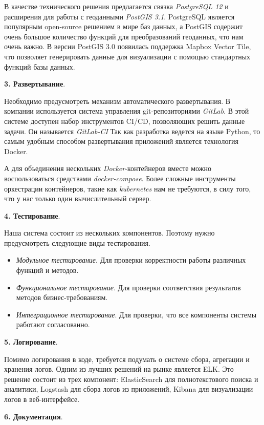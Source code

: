 В качестве технического решения предлагается связка \textit{PostgreSQL 12} и расширения для работы с геоданными
\textit{PostGIS 3.1}. PostgreSQL является популярным open-source решением в мире баз данных,
а PostGIS содержит очень большое количество функций для преобразований геоданных, что нам очень важно.
В версии PostGIS 3.0 появилась поддержка Mapbox Vector Tile, что позволяет генерировать данные для визуализации с помощью
стандартных функций базы данных.

\noindent \textbf{3. Развертывание}.

Необходимо предусмотреть механизм автоматического развертывания.
В компании используется система управления git-репозиториями \textit{GitLab}.
В этой системе доступен набор инструментов CI/CD, позволяющих решить данные задачи. Он называется \textit{GitLab-CI}
Так как разработка ведется на языке Python, то самым удобным способом развертывания приложений является технология Docker.

А для объединения нескольких \textit{Docker}-контейнеров вместе можно воспользоваться средствами \textit{docker-compose}.
Более сложные инструменты оркестрации контейнеров, такие как \textit{kubernetes} нам не требуются, в силу того, что у нас
только один вычислительный сервер.

\noindent \textbf{4. Тестирование}.

Наша система состоит из нескольких компонентов. Поэтому нужно предусмотреть следующие виды тестирования.
\begin{itemize}
    \item \textit{Модульное тестирование}. Для проверки корректности работы различных функций и методов.
    \item \textit{Функциональное тестирование}. Для проверки соответствия результатов методов бизнес-требованиям.
    \item \textit{Интеграционное тестирование}. Для проверки, что все компоненты системы работают согласованно.
\end{itemize}

\noindent \textbf{5. Логирование}.

Помимо логирования в коде, требуется подумать о системе сбора, агрегации и хранения логов.
Одним из лучших решений на рынке является ELK. Это решение состоит из трех компонент: ElasticSearch для полнотекстового
поиска и аналитики, Logstash для сбора логов из приложений, Kibana для визуализации логов в веб-интерфейсе.

\noindent \textbf{6. Документация}.

